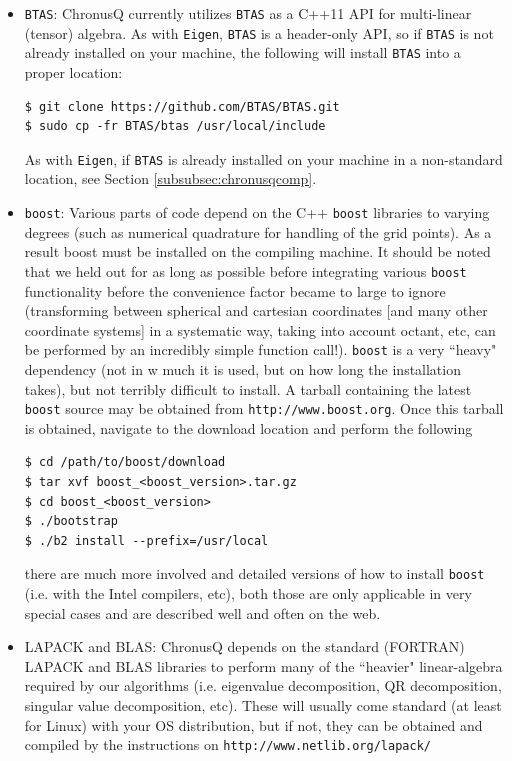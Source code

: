 \documentclass[12pt]{article}
\begin{document}
\begin{itemize}
\item \texttt{BTAS}: ChronusQ currently utilizes \texttt{BTAS} as a C++11 API for multi-linear (tensor) algebra. As with \texttt{Eigen}, \texttt{BTAS} is a header-only API, so if \texttt{BTAS} is not already installed on your machine, the following will install \texttt{BTAS} into a proper location:
\begin{lstlisting}
$ git clone https://github.com/BTAS/BTAS.git
$ sudo cp -fr BTAS/btas /usr/local/include
\end{lstlisting}
As with \texttt{Eigen}, if \texttt{BTAS} is already installed on your machine in a non-standard location, see Section \ref{subsubsec:chronusqcomp}.

\item \texttt{boost}: Various parts of code depend on the C++ \texttt{boost} libraries to varying degrees (such as numerical quadrature for handling of the grid points). As a result boost must be installed on the compiling machine. It should be noted that we held out for as long as possible before integrating various \texttt{boost} functionality before the convenience factor became to large to ignore (transforming between spherical and cartesian coordinates [and many other coordinate systems] in a systematic way, taking into account octant, etc, can be performed by an incredibly simple function call!). \texttt{boost} is a very ``heavy" dependency (not in w much it is used, but on how long the installation takes), but not terribly difficult to install. A tarball containing the latest \texttt{boost} source may be obtained from \texttt{http://www.boost.org}. Once this tarball is obtained, navigate to the download location and perform the following
\begin{lstlisting}
$ cd /path/to/boost/download
$ tar xvf boost_<boost_version>.tar.gz
$ cd boost_<boost_version>
$ ./bootstrap
$ ./b2 install --prefix=/usr/local
\end{lstlisting}
there are much more involved and detailed versions of how to install \texttt{boost} (i.e. with the Intel compilers, etc), both those are only applicable in very special cases and are described well and often on the web.

\item LAPACK and BLAS: ChronusQ depends on the standard (FORTRAN) LAPACK and BLAS libraries to perform many of the ``heavier" linear-algebra required by our algorithms (i.e. eigenvalue decomposition, QR decomposition, singular value decomposition, etc). These will usually come standard (at least for Linux) with your OS distribution, but if not, they can be obtained and compiled by the instructions on \texttt{http://www.netlib.org/lapack/}
\end{itemize}
\end{document}
